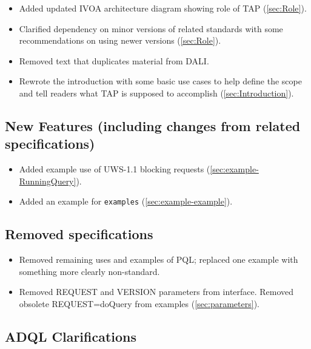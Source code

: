 \documentclass[11pt,letter]{ivoa}
\begin{document}
\begin{itemize}

\item Added updated IVOA architecture diagram showing role of TAP  (\ref{sec:Role}). 

\item Clarified dependency on minor versions of related standards with some recommendations on
using newer versions (\ref{sec:Role}).

\item Removed text that duplicates material from DALI. 

\item Rewrote the introduction with some basic use cases to help define 
the scope and tell readers what TAP is supposed to accomplish (\ref{sec:Introduction}).

\end{itemize}

\subsection{New Features (including changes from related specifications)}

\begin{itemize}
\item Added example use of UWS-1.1 blocking requests (\ref{sec:example-RunningQuery}). 

\item Added an example for \verb|examples| (\ref{sec:example-example}).
\end{itemize}

\subsection{Removed specifications}

\begin{itemize}
\item Removed remaining uses and examples of PQL; replaced one example with something more clearly non-standard.

\item Removed REQUEST and VERSION parameters from interface. Removed obsolete REQUEST=doQuery from examples (\ref{sec:parameters}).
\end{itemize}

\subsection{ADQL Clarifications}
\end{document}
